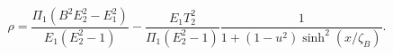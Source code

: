 \begin{equation}\label{2rh}
\rho =\frac{\Pi_{1}(B^{2}E_{2}^{2}-E_{1}^{2})}{E_{1}(E_{2}^{2}-1)}
-\frac{E_{1}T_2^2}{\Pi_{1}(E_{2}^{2}-1)}
\frac{1}{1+(1-u^{2})\sinh^{2}(x/\zeta_B)}.
\end{equation}


